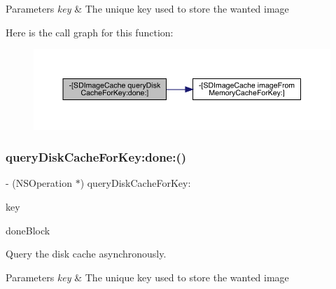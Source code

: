 \begin{DoxyParams}{Parameters}
{\em key} & The unique key used to store the wanted image \\
\hline
\end{DoxyParams}
Here is the call graph for this function\+:\nopagebreak
\begin{figure}[H]
\begin{center}
\leavevmode
\includegraphics[width=350pt]{interface_s_d_image_cache_a55f77fe338c314178df36dc68a4995fd_cgraph}
\end{center}
\end{figure}
\mbox{\label{interface_s_d_image_cache_a55f77fe338c314178df36dc68a4995fd}} 
\subsubsection{\texorpdfstring{query\+Disk\+Cache\+For\+Key\+:done\+:()}{queryDiskCacheForKey:done:()}\hspace{0.1cm}{\footnotesize\ttfamily [2/3]}}
{\footnotesize\ttfamily -\/ (N\+S\+Operation $\ast$) query\+Disk\+Cache\+For\+Key\+: \begin{DoxyParamCaption}\item[{(N\+S\+String $\ast$)}]{key }\item[{done:(S\+D\+Web\+Image\+Query\+Completed\+Block)}]{done\+Block }\end{DoxyParamCaption}}

Query the disk cache asynchronously.


\begin{DoxyParams}{Parameters}
{\em key} & The unique key used to store the wanted image \\
\hline
\end{DoxyParams}
\mbox{\label{interface_s_d_image_cache_a55f77fe338c314178df36dc68a4995fd}} 
